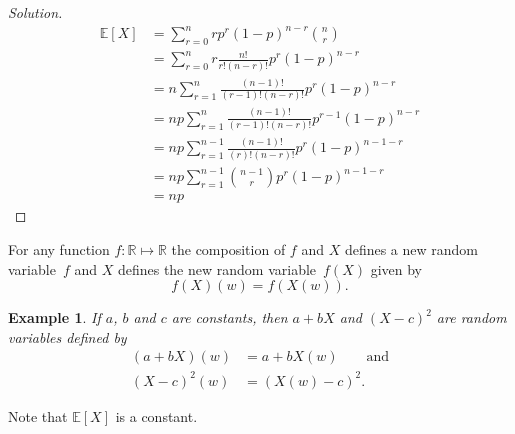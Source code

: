 \documentclass{notes}
\theoremstyle{plain}
\newtheorem*{example}{Example}
\newcommand{\bR}{\mathbb{R}}
\newcommand{\bE}{\mathbb{E}}
\newcommand{\rv}{random variable\ }
\newcommand{\expect}[1]{\bE\!\left[#1\right]}
\begin{document}
\begin{proof}[Solution]
\begin{align*}
\expect{X} &= \sum_{r=0}^n r p^r (1-p)^{n-r} \binom{n}{r}\\
&= \sum_{r=0}^n r \frac{n!}{r!(n-r)!} p^r (1-p)^{n-r}\\
&=n \sum_{r=1}^n  \frac{(n-1)!}{(r-1)!(n-r)!} p^r (1-p)^{n-r}\\
&=np \sum_{r=1}^n  \frac{(n-1)!}{(r-1)!(n-r)!} p^{r-1} (1-p)^{n-r}\\
&=np \sum_{r=1}^{n-1}  \frac{(n-1)!}{(r)!(n-r)!} p^r (1-p)^{n-1-r}\\
&=np \sum_{r=1}^{n-1} \binom{n-1}{r} p^r (1-p)^{n-1-r}\\
&=np
\end{align*}
\end{proof}

For any function $f \colon \bR \mapsto \bR$ the composition of $f$ and $X$
defines a new \rv $f$ and $X$ defines the new \rv $f(X)$ given by
\[
f(X)(w) = f(X(w)).
\]

\begin{example}
If $a$, $b$ and $c$ are constants, then
$a+bX$ and $(X-c)^2$ are random variables
defined by
\begin{align*}
(a+bX)(w) &= a+bX(w) \qquad \text{and} \\
(X-c)^2(w) &= (X(w)-c)^2.
\end{align*}
\end{example}

Note that $\expect{X}$ is a constant.
\end{document}
